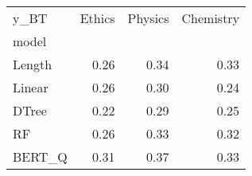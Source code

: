 \begin{tabular}{lrrr}
\toprule
y\_BT &  Ethics &  Physics &  Chemistry \\
model  &         &          &            \\
\midrule
Length &    0.26 &     0.34 &       0.33 \\
Linear &    0.26 &     0.30 &       0.24 \\
DTree  &    0.22 &     0.29 &       0.25 \\
RF     &    0.26 &     0.33 &       0.32 \\
BERT\_Q &    0.31 &     0.37 &       0.33 \\
\bottomrule
\end{tabular}
